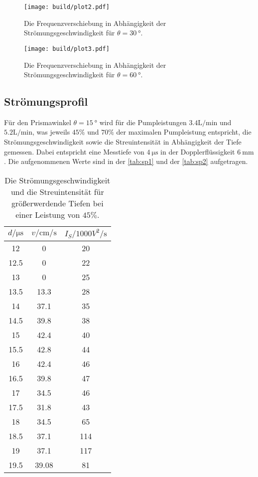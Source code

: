 \begin{figure}[H]
	\texttt{[image: build/plot2.pdf]}
	\captionsetup{width=0.765\linewidth}
	\caption{Die Frequenzverschiebung in Abhängigkeit der Strömungsgeschwindigkeit für $\theta = \qty{30}{°}$.}
	\label{fig:plot2}
\end{figure}

\begin{figure}[H]
	\texttt{[image: build/plot3.pdf]}
	\captionsetup{width=0.765\linewidth}
	\caption{Die Frequenzverschiebung in Abhängigkeit der Strömungsgeschwindigkeit für $\theta = \qty{60}{°}$.}
	\label{fig:plot3}
\end{figure}

\subsection{Strömungsprofil}
\label{sec:Strömungsprofil}

Für den Prismawinkel $\theta = \qty{15}{°}$ wird für die Pumpleistungen $ 3.4 \si{\liter\per\minute}$ und $ 5.2 \si{\liter\per\minute}$, was jeweils
$45\%$  und $70\%$ der maximalen Pumpleistung entspricht, die Strömungsgeschwindigkeit sowie die Streuintensität in Abhängigkeit der Tiefe gemessen.
Dabei entspricht eine Messtiefe von $\qty{4}{\micro\second}$ in der Dopplerflüssigkeit $\qty{6}{\milli\meter}$.
Die aufgenommenen Werte sind in der \autoref{tab:sp1} und der \autoref{tab:sp2} aufgetragen.

\begin{table}[H]
    \centering
    \caption{Die Strömungsgeschwindigkeit und die Streuintensität für größerwerdende Tiefen bei einer Leistung von $45 \%$.}
    \label{tab:sp1}
\begin{tabular}{c c c}
    \toprule
    $d / \si{\micro\second}$ & $ v / \si{\centi \meter \per \second}$ & $I_S / 1000 \si{ V^2 \per \second} $\\
    \midrule
      12 &     0 &  20 \\
    12.5 &     0 &  22 \\
      13 &     0 &  25 \\
    13.5 &  13.3 &  28 \\
      14 &  37.1 &  35 \\
    14.5 &  39.8 &  38 \\
      15 &  42.4 &  40 \\
    15.5 &  42.8 &  44 \\
      16 &  42.4 &  46 \\
    16.5 &  39.8 &  47 \\
      17 &  34.5 &  46 \\
    17.5 &  31.8 &  43 \\
      18 &  34.5 &  65 \\
    18.5 &  37.1 & 114 \\
      19 &  37.1 & 117 \\
    19.5 & 39.08 &  81 \\
    \bottomrule
    \end{tabular}
\end{table}

